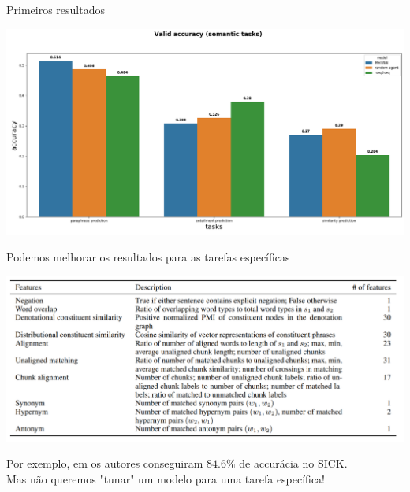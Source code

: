 \documentclass[10pt]{beamer}
\begin{document}
\begin{frame}{Primeiros resultados}
\begin{center}
\includegraphics[scale=0.28]{images/both_semantic_tasks.png}
\end{center}
\end{frame}

\begin{frame}{Podemos melhorar os resultados para as tarefas específicas}

\begin{center}
\includegraphics[scale=0.21]{images/features_sick.png}
\end{center}

Por exemplo, em \cite{S14-2055} os autores conseguiram $84.6\%$ de accurácia no SICK.\\

\alert{Mas não queremos "tunar" um modelo para uma tarefa específica!} 

\end{frame}
\end{document}
